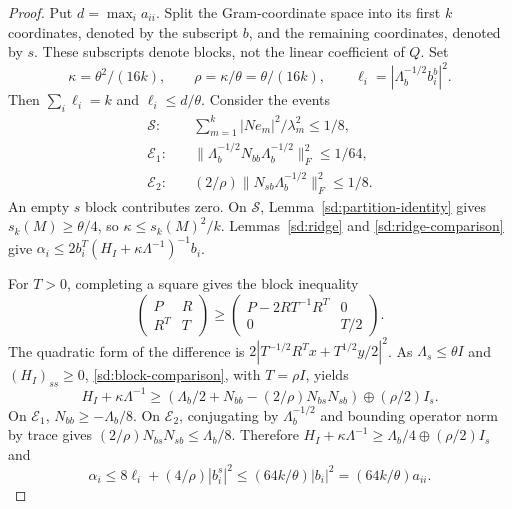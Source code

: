 \begin{proof}
Put $d=\max_i a_{ii}$.  Split the Gram-coordinate space into its
first $k$ coordinates, denoted by the subscript $b$, and the
remaining coordinates, denoted by $s$.  These subscripts denote
blocks, not the linear coefficient of $Q$.  Set
\[
 \kappa=\theta^2/(16k),\qquad \rho=\kappa/\theta=\theta/(16k),
 \qquad \ell_i=|\Lambda_b^{-1/2}b_i^b|^2.
\]
Then $\sum_i\ell_i=k$ and $\ell_i\leq d/\theta$.
Consider the events
\begin{align*}
 \mathcal S:\quad&
 \sum_{m=1}^k |Ne_m|^2/\lambda_m^2\leq1/8,\\
 \mathcal E_1:\quad&
 \|\Lambda_b^{-1/2}N_{bb}\Lambda_b^{-1/2}\|_F^2\leq1/64,\\
 \mathcal E_2:\quad&
 (2/\rho)\|N_{sb}\Lambda_b^{-1/2}\|_F^2\leq1/8.
\end{align*}
An empty $s$ block contributes zero.
On $\mathcal S$, Lemma~\ref{sd:partition-identity} gives
$s_k(M)\geq\theta/4$, so $\kappa\leq s_k(M)^2/k$.
Lemmas~\ref{sd:ridge} and \ref{sd:ridge-comparison} give
$\alpha_i\leq2b_i^T(H_I+\kappa\Lambda^{-1})^{-1}b_i$.

For $T>0$, completing a square gives the block inequality
\begin{equation}\label{sd:block-comparison}
 \begin{pmatrix}P&R\\R^T&T\end{pmatrix}
 \geq
 \begin{pmatrix}P-2RT^{-1}R^T&0\\0&T/2\end{pmatrix}.
\end{equation}
The quadratic form of the difference is
$2|T^{-1/2}R^Tx+T^{1/2}y/2|^2$.
As $\Lambda_s\leq\theta I$ and $(H_I)_{ss}\geq0$,
\eqref{sd:block-comparison}, with $T=\rho I$, yields
\[
 H_I+\kappa\Lambda^{-1}
 \geq
 \left(\Lambda_b/2+N_{bb}-(2/\rho)N_{bs}N_{sb}\right)
       \oplus(\rho/2)I_s.
\]
On $\mathcal E_1$, $N_{bb}\geq-\Lambda_b/8$.
On $\mathcal E_2$, conjugating by $\Lambda_b^{-1/2}$ and bounding
operator norm by trace gives
$(2/\rho)N_{bs}N_{sb}\leq\Lambda_b/8$.
Therefore
$H_I+\kappa\Lambda^{-1}\geq\Lambda_b/4\oplus(\rho/2)I_s$ and
\[
 \alpha_i\leq8\ell_i+(4/\rho)|b_i^s|^2
 \leq(64k/\theta)|b_i|^2=(64k/\theta)a_{ii}.
\]


\end{proof}
